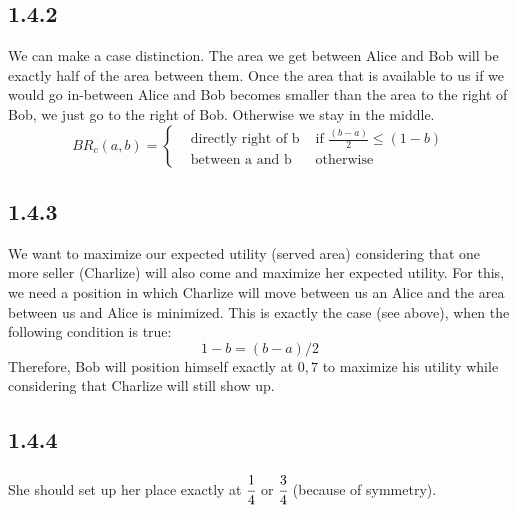 \documentclass[11pt]{article}
\begin{document}
    \subsection*{1.4.2}
    We can make a case distinction. The area we get between Alice and Bob will be exactly half of the area between them.
    Once the area that is available to us if we would go in-between Alice and Bob becomes smaller than the area to the right of
    Bob, we just go to the right of Bob. Otherwise we stay in the middle.
    \begin{equation}
        BR_c(a,b)=\left\{
        \begin{array}{lll}
            & \text{directly right of b } & \mbox{if } \frac{(b-a)}{2}\leq(1-b) \\
            & \mbox{between a and b}      & \text{otherwise}
        \end{array}
        \right.
    \end{equation}
    \subsection*{1.4.3}
    We want to maximize our expected utility (served area) considering that one more seller (Charlize) will also come and maximize
    her expected utility. For this, we need a position in which Charlize will move between us an Alice and the area between us and
    Alice is minimized. This is exactly the case (see above), when the following condition is true:
    \begin{equation}
        1-b = (b-a)/2
    \end{equation}
    Therefore, Bob will position himself exactly at $0,7$ to maximize his utility while considering that Charlize will still show up.

    \subsection*{1.4.4}
    She should set up her place exactly at $\cfrac{1}{4}$ or $\cfrac{3}{4}$ (because of symmetry).
\end{document}
